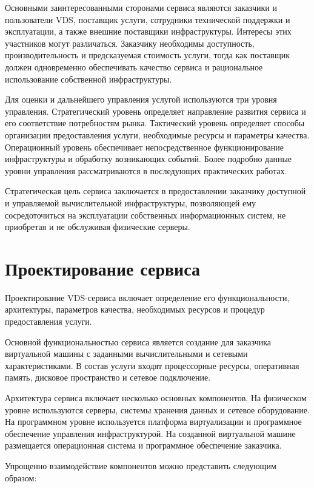 \documentclass[14pt,a4paper]{extarticle}
\begin{document}
Основными заинтересованными сторонами сервиса являются заказчики и пользователи
VDS, поставщик услуги, сотрудники технической поддержки и эксплуатации, а также
внешние поставщики инфраструктуры. Интересы этих участников могут различаться.
Заказчику необходимы доступность, производительность и предсказуемая стоимость
услуги, тогда как поставщик должен одновременно обеспечивать качество сервиса и
рациональное использование собственной инфраструктуры.

    Для оценки и дальнейшего управления услугой используются три уровня управления.
    Стратегический уровень определяет направление развития сервиса и его
    соответствие потребностям рынка. Тактический уровень определяет способы
    организации предоставления услуги, необходимые ресурсы и параметры качества.
    Операционный уровень обеспечивает непосредственное функционирование
    инфраструктуры и обработку возникающих событий. Более подробно данные уровни
    управления рассматриваются в последующих практических работах.

    Стратегическая цель сервиса заключается в предоставлении заказчику доступной и
    управляемой вычислительной инфраструктуры, позволяющей ему сосредоточиться на
    эксплуатации собственных информационных систем, не приобретая и не обслуживая
    физические серверы.

    \section{Проектирование сервиса}

    Проектирование VDS-сервиса включает определение его функциональности,
    архитектуры, параметров качества, необходимых ресурсов и процедур
    предоставления услуги.

    Основной функциональностью сервиса является создание для заказчика виртуальной
    машины с заданными вычислительными и сетевыми характеристиками. В состав услуги
    входят процессорные ресурсы, оперативная память, дисковое пространство и
    сетевое подключение.

    Архитектура сервиса включает несколько основных компонентов. На физическом
    уровне используются серверы, системы хранения данных и сетевое оборудование. На
    программном уровне используется платформа виртуализации и программное
    обеспечение управления инфраструктурой. На созданной виртуальной машине
    размещается операционная система и программное обеспечение заказчика.

    Упрощенно взаимодействие компонентов можно представить следующим образом:
\end{document}
